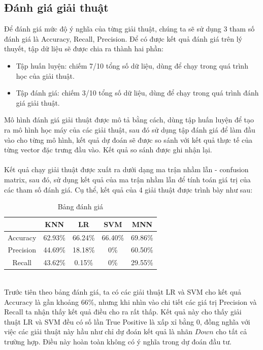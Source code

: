 \subsection{Đánh giá giải thuật}
Để đánh giá mức độ ý nghĩa của từng giải thuật, chúng ta sẽ sử dụng 3 tham số 
đánh giá là Accuracy, Recall, Precision. Để có được kết quả đánh giá trên lý 
thuyết, tập dữ liệu sẽ được chia ra thành hai phần:
\begin{itemize}
\item Tập huấn luyện: chiếm 7/10 tổng số dữ liệu, dùng để chạy trong quá trình 
học của giải thuật.
\item Tập đánh giá: chiếm 3/10 tổng số dữ liệu, dùng để chạy trong quá trình 
đánh giá giải thuật.
\end{itemize}
Mô hình đánh giá giải thuật được mô tả bằng cách, dùng tập huấn luyện để tạo 
ra mô hình học máy của các giải thuật, sau đó sử dụng tập đánh giá để làm đầu 
vào cho từng mô hình, kết quả dự đoán sẽ được so sánh với kết quả thực tế của 
từng vector đặc trưng đầu vào. Kết quả so sánh được ghi nhận lại.\\\\
Kết quả chạy giải thuật được xuất ra dưới dạng ma trận nhầm lẫn - confusion 
matrix, sau đó, sử dụng kết quả của ma trận nhầm lẫn để tính toán giá trị của 
các tham số đánh giá. Cụ thể, kết quả của 4 giải thuật được trình bày như sau:
\begin{table}[h]
\centering
\begin{tabular}{ |c|c|c|c|c| }
\hline
 & KNN & LR & SVM & MNN \\
\hline
Accuracy & 62.93\% & 66.24\% & 66.40\% & 69.86\% \\
\hline
Precision & 44.69\% & 18.18\% & 0\% & 60.50\% \\
\hline
Recall & 43.62\% & 0.15\% & 0\% & 29.55\% \\
\hline
\end{tabular}
\caption{Bảng đánh giá}
\end{table}\\
Trước tiên theo bảng đánh giá, ta có các giải thuật LR và SVM cho kết quả Accuracy
là gần khoảng 66\%, nhưng khi nhìn vào chi tiết các giá trị Precision và Recall 
ta nhận thấy kết quả điều cho ra rất thấp. Kết quả này cho thấy giải thuật LR 
và SVM đều có số lần True Positive là xấp xỉ bằng 0, đồng nghĩa với việc các 
giải thuật này hầu như chỉ dự đoán kết quả là nhãn $Down$ cho tất cả trường hợp. 
Điều này hoàn toàn không có ý nghĩa trong dự đoán đầu tư.\\\\
